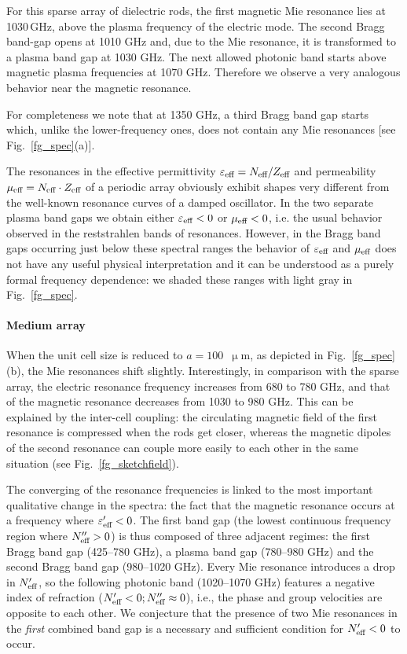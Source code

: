 {For this sparse array of dielectric rods, the first magnetic Mie resonance lies 
at 1030\,GHz, above the plasma frequency of the electric mode.  The second Bragg 
band-gap opens at 1010 GHz and, due to the Mie resonance, it is transformed to a 
plasma band gap at 1030 GHz. The next allowed photonic band starts above 
magnetic plasma frequencies at 1070 GHz. Therefore we observe a very analogous 
behavior near the magnetic resonance. 

For completeness we note that at 1350 GHz, a third Bragg band gap
starts which, unlike the lower-frequency ones, does not contain any Mie resonances 
[see Fig.\ \ref{fg_spec}(a)].

The resonances in the effective permittivity $\varepsilon_{\text{eff} }=N_{\text{eff} }/Z_{\text{eff} }$ and permeability $\mu_{\text{eff} }
= N_{\text{eff} }\cdot Z_{\text{eff} }$ of a periodic array obviously exhibit shapes very different from the
well-known resonance curves of a damped oscillator\cite{koschny2003resonant}. In the two
separate plasma band gaps we obtain either $\varepsilon_{\text{eff} } < 0$ or $\mu_{\text{eff} }<0$, i.e. the usual
behavior observed in the reststrahlen bands of resonances. However, in the Bragg band
gaps occurring just below these spectral ranges the behavior of $\varepsilon_{\text{eff} }$ and $\mu_{\text{eff} }$ does
not have any useful physical interpretation and it can be understood as a purely formal
frequency dependence: we shaded these ranges with light gray in Fig.~\ref{fg_spec}.

\paragraph{Medium array}
When the unit cell size is reduced to $a=100$~$\upmu$m, as depicted in
Fig.~\ref{fg_spec}(b), the Mie resonances shift slightly. Interestingly, in comparison with the sparse array, the electric
resonance frequency increases from 680 to 780 GHz, and that of the
magnetic resonance decreases from 1030 to 980 GHz. This can be explained by the
inter-cell coupling: the circulating magnetic field of the first resonance is compressed
when the rods get closer, whereas the magnetic dipoles of the second resonance can couple
more easily to each other in the same situation (see Fig.~\ref{fg_sketchfield}).

The converging of the resonance frequencies is linked to the most important
qualitative change in the spectra: the fact that the magnetic resonance occurs at a
frequency where $\varepsilon_{\text{eff} }'<0$. The first band gap (the lowest continuous frequency region where
$N_{\text{eff} }''>0$) is thus composed of three adjacent regimes: the first Bragg band gap
(425--780 GHz), a plasma band gap (780--980 GHz) and the second Bragg band gap (980--1020
GHz). Every Mie resonance introduces a drop in $N_{\text{eff} }'$, so the following photonic band
(1020--1070 GHz) features a negative index of refraction ($N_{\text{eff} }'<0; N_{\text{eff} }''\approx 0$),
i.e., the phase and group velocities are opposite to each other. We conjecture that the presence of two
Mie resonances in the \textit{first} combined band gap is a necessary and sufficient condition for
$N_{\text{eff} }'<0$ to occur.

}
